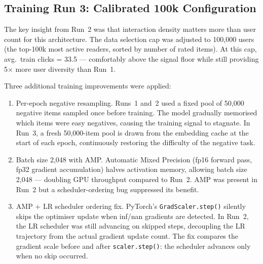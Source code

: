 \subsection{Training Run 3: Calibrated 100k Configuration}
\label{sec:train_run3}

The key insight from Run~2 was that interaction density matters more than user count for this architecture.
The data selection cap was adjusted to 100{,}000 users (the top-100k most active readers, sorted by number of rated items).
At this cap, avg.\ train clicks = 33.5 — comfortably above the signal floor while still providing 5$\times$ more user diversity than Run~1.

Three additional training improvements were applied:

\begin{enumerate}
    \item Per-epoch negative resampling.
    Runs~1 and~2 used a fixed pool of 50{,}000 negative items sampled once before training.
    The model gradually memorised which items were easy negatives, causing the training signal to stagnate.
    In Run~3, a fresh 50{,}000-item pool is drawn from the embedding cache at the start of each epoch, continuously restoring the difficulty of the negative task.

    \item Batch size 2{,}048 with AMP.
    Automatic Mixed Precision (fp16 forward pass, fp32 gradient accumulation) halves activation memory, allowing batch size 2{,}048 — doubling GPU throughput compared to Run~2.
    AMP was present in Run~2 but a scheduler-ordering bug suppressed its benefit.

    \item AMP + LR scheduler ordering fix.
    PyTorch's \texttt{GradScaler.step()} silently skips the optimiser update when inf/nan gradients are detected.
    In Run~2, the LR scheduler was still advancing on skipped steps, decoupling the LR trajectory from the actual gradient update count.
    The fix compares the gradient scale before and after \texttt{scaler.step()}: the scheduler advances only when no skip occurred.
\end{enumerate}

